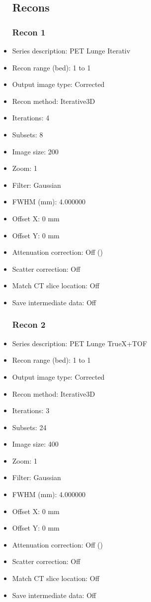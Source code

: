\documentclass[12pt]{article}
\begin{document}
\begin{itemize}[noitemsep]
\subsection{Recons}
\subsubsection{Recon 1}
\item Series description: PET Lunge Iterativ
\item Recon range (bed): 1 to 1
\item Output image type: Corrected
\item Recon method: Iterative3D
\item Iterations: 4
\item Subsets: 8
\item Image size: 200
\item Zoom: 1
\item Filter: Gaussian
\item FWHM (mm): 4.000000
\item Offset X: 0 mm
\item Offset Y: 0 mm
\item Attenuation correction: Off ()
\item Scatter correction: Off
\item Match CT slice location: Off
\item Save intermediate data: Off
\subsubsection{Recon 2}
\item Series description: PET Lunge TrueX+TOF
\item Recon range (bed): 1 to 1
\item Output image type: Corrected
\item Recon method: Iterative3D
\item Iterations: 3
\item Subsets: 24
\item Image size: 400
\item Zoom: 1
\item Filter: Gaussian
\item FWHM (mm): 4.000000
\item Offset X: 0 mm
\item Offset Y: 0 mm
\item Attenuation correction: Off ()
\item Scatter correction: Off
\item Match CT slice location: Off
\item Save intermediate data: Off

\end{itemize}
\end{document}
